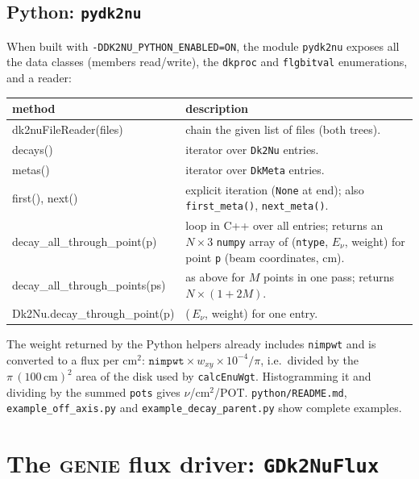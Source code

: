 \documentclass[11pt]{article}
\newcommand{\code}[1]{\texttt{#1}}
\newcommand{\genie}{\textsc{genie}\xspace}
\begin{document}
\subsection{Python: \code{pydk2nu}}\label{sec:python}

When built with \code{-DDK2NU\_PYTHON\_ENABLED=ON}, the module
\code{pydk2nu} exposes all the data classes (members read/write), the
\code{dkproc} and \code{flgbitval} enumerations, and a reader:
\begin{center}\small
\begin{tabularx}{\textwidth}{>{\ttfamily}l X}
\toprule
\textrm{\textbf{method}} & \textbf{description} \\ \midrule
dk2nuFileReader(files) & chain the given list of files (both trees). \\
decays()               & iterator over \code{Dk2Nu} entries. \\
metas()                & iterator over \code{DkMeta} entries. \\
first(), next()        & explicit iteration (\code{None} at end); also
                         \code{first\_meta()}, \code{next\_meta()}. \\
decay\_all\_through\_point(p) & loop in C++ over all entries; returns an
         $N\times 3$ \code{numpy} array of (\code{ntype}, $E_\nu$, weight)
         for point \code{p} (beam coordinates, cm). \\
decay\_all\_through\_points(ps) & as above for $M$ points in one pass;
         returns $N\times(1+2M)$. \\
Dk2Nu.decay\_through\_point(p) & (\,$E_\nu$, weight) for one entry. \\
\bottomrule
\end{tabularx}
\end{center}
The weight returned by the Python helpers already includes
\code{nimpwt} and is converted to a flux per cm$^2$:
$\code{nimpwt}\times w_{xy}\times 10^{-4}/\pi$, i.e.\ divided by the
$\pi\,(100\,\mathrm{cm})^2$ area of the disk used by \code{calcEnuWgt}.
Histogramming it and dividing by the summed \code{pots} gives
$\nu$/cm$^2$/POT.  \code{python/README.md}, \code{example\_off\_axis.py}
and \code{example\_decay\_parent.py} show complete examples.

\section{The \genie flux driver: \code{GDk2NuFlux}}\label{sec:genie}
\end{document}
